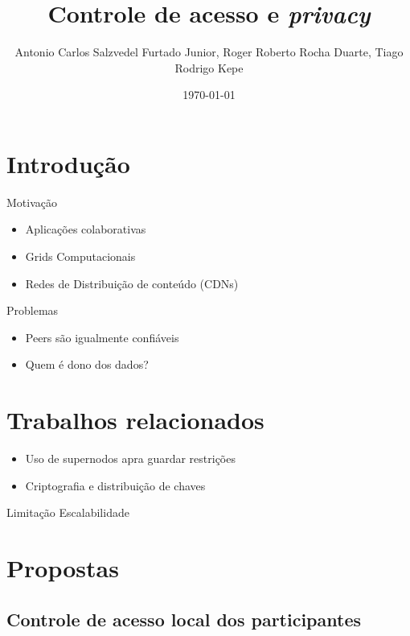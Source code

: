 \documentclass{beamer}
\title[Trabalho de Gerenciamento de Dados Distribuídos - CI303]{Controle de acesso e \textit{privacy}}
\author[Antonio Carlos, Roger e Tiago.]{Antonio Carlos Salzvedel Furtado Junior, Roger Roberto Rocha Duarte, Tiago Rodrigo Kepe}
\institute{Universidade Federal do Paraná - UFPR}
\date{\today}
\begin{document}
\begin{frame}
\titlepage
\end{frame}


\section{Introdução}


\begin{frame}{Motivação}

	\begin{itemize}
	 \item Aplicações colaborativas
	 \item Grids Computacionais
	 \item Redes de Distribuição de conteúdo (CDNs)
	\end{itemize}
\end{frame}

\begin{frame}{Problemas}

	\begin{itemize}
	 \item Peers são igualmente confiáveis
	 \item Quem é dono dos dados?
	\end{itemize}
\end{frame}


\section{Trabalhos relacionados}
\begin{frame}
    \begin{itemize}
      \item Uso de supernodos apra guardar restrições
      \item Criptografia e distribuição de chaves
    \end{itemize}
    \begin{block}{Limitação}
      Escalabilidade
    \end{block}

  \end{frame}

\section{Propostas}

\subsection{Controle de acesso local dos participantes} %
\end{document}
